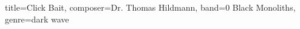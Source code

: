 \documentclass[10pt, a5paper]{article}
\begin{document}
 

\begin{song}{
    title={Click Bait},
    composer={Dr. Thomas Hildmann},
    band={0 Black Monoliths},
    genre={dark wave}
  }

  \begin{verse}

  \end{verse}
  

  \begin{chorus}

  
  \end{chorus}

 

\end{song}
\end{document}
